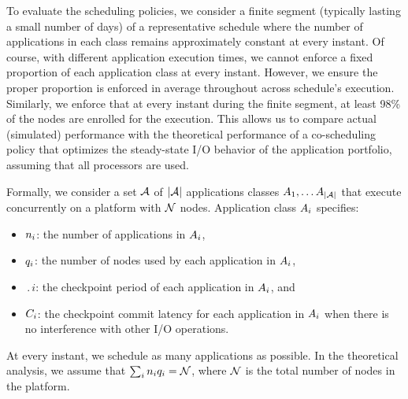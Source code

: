 To evaluate the scheduling policies, we consider a finite segment (typically lasting
a small number of days) of a representative schedule where the number of applications
in each class remains approximately constant at every instant. Of course, with
different application execution times, we cannot enforce a fixed proportion of each
application class at every instant. However, we ensure the proper proportion is
enforced in average throughout across schedule's execution. Similarly, we enforce
that at every instant during the finite segment, at least 98\% of the nodes
 are enrolled for the execution. This allows us to compare actual
(simulated) performance with the theoretical performance of a co-scheduling policy
that optimizes the steady-state I/O behavior of the application portfolio, assuming
that all processors are used. 
    
Formally, we consider a set ${\mathcal A}$ of $|{\mathcal A}|$ applications classes
$A_{1}, \ldots A_{|{\mathcal A}|}$ that execute concurrently on a platform with
${\mathcal N}$ nodes. Application class $A_{i}$ specifies:
%
\begin{itemize}
\item $n_{i}$: the number of applications in $A_{i}$,
\item $q_{i}$: the number of nodes used by each application in $A_{i}$,
\item $\period{i}$: the checkpoint period of each application in $A_{i}$, and
\item $C_{i}$: the checkpoint commit latency for each application in $A_{i}$
  when there is no interference with other I/O operations.
\end{itemize}
%
%
At every instant, we schedule as many applications as possible. 
In the theoretical analysis, we assume that
$\sum_{i}n_{i} q_{i} = {\mathcal N}$, where ${\mathcal N}$ is the total
number of nodes in the platform.


